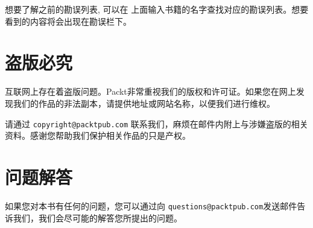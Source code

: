 想要了解之前的勘误列表, 可以在  上面输入书籍的名字查找对应的勘误列表。想要看到的内容将会出现在勘误栏下。

\section{盗版必究}

互联网上存在着盗版问题。Packt非常重视我们的版权和许可证。如果您在网上发现我们的作品的非法副本，请提供地址或网站名称，以便我们进行维权。

请通过 \texttt{copyright@packtpub.com} 联系我们，麻烦在邮件内附上与涉嫌盗版的相关资料。感谢您帮助我们保护相关作品的只是产权。

\section{问题解答}

如果您对本书有任何的问题，您可以通过向 \texttt{questions@packtpub.com}发送邮件告诉我们，我们会尽可能的解答您所提出的问题。


